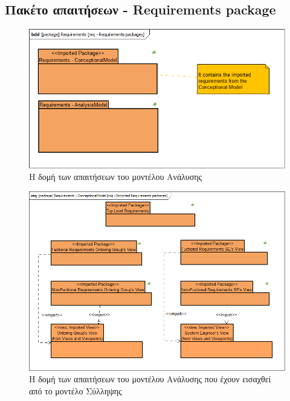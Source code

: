 \documentclass[a4paper,12pt,twoside]{report}
\begin{document}
{\begin{appendices}
			\FloatBarrier
			\subsection{Πακέτο απαιτήσεων - Requirements package}

			\clearpage
			\begin{figure}[hp]
					\centering
					\includegraphics[scale=0.30]{AnalysisModel_req-Requirementspackages.png}
					\caption{Η δομή των απαιτήσεων του μοντέλου Ανάλυσης}
					\label{φωτ:Η δομή των απαιτήσεων του μοντέλου Ανάλυσης}
			\end{figure}
			
			\begin{figure}[hp]
					\centering
					\includegraphics[scale=0.30]{AnalysisModel_pkg-ImportedRequirementspackages.png}
					\caption{Η δομή των απαιτήσεων του μοντέλου Ανάλυσης που έχουν εισαχθεί από το μοντέλο Σύλληψης}
					\label{φωτ:Η δομή των απαιτήσεων του μοντέλου Ανάλυσης που έχουν εισαχθεί από το μοντέλο Σύλληψης}
			\end{figure}
			

\end{appendices}}
\end{document}
